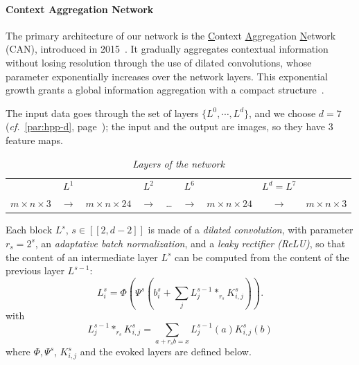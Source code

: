 \documentclass{article}
\begin{document}
            \paragraph{Context Aggregation Network}
            The primary architecture of our network is the \underline{C}ontext \underline{A}ggregation \underline{N}etwork (CAN), introduced in 2015~\cite{yu2015}. It gradually aggregates contextual information without losing resolution through the use of dilated convolutions, whose parameter exponentially increases over the network layers. This exponential growth grants a global information aggregation with a compact structure~\cite{yu2015,chen2017}.
            \par
            The input data goes through the set of layers $\{L^0, \cdots, L^d\}$, and we choose $d=7$ (\textit{cf.}~\ref{par:hpp-d}, page~\pageref{par:hpp-d}); the input and the output are images, so they have 3 feature maps.

            \begin{table}[!ht]
                \centering
                \begin{tabular}{ccccccccc}
                    \hline
                     & $L^1$ & & $L^2$ & & $L^6$ & & $L^d=L^7$ & \\
                    $m\times n\times 3$ & $\longrightarrow$ &$m\times n\times 24$ & $\longrightarrow$ & \dots & $\longrightarrow$ & $m\times n\times 24$ & $\longrightarrow$ & $m\times n\times 3$ \\
                    \hline
                \end{tabular}
                \caption{\textit{Layers of the network}}
            \end{table}
            \par
            Each block $L^s$, $s\in [\![2,d-2]\!]$ is made of a \textit{dilated convolution}, with parameter $r_s=2^s$, an \textit{adaptative batch normalization}, and a \textit{leaky rectifier (ReLU)}, so that the content of an intermediate layer $L^s$ can be computed from the content of the previous layer $L^{s-1}$:
            \begin{equation}
                L_i^s=\Phi\left(\Psi^s\left(b_i^s+\sum_jL_j^{s-1}*_{r_s}K^s_{i,j}\right)\right).
            \end{equation}
            with
            \begin{equation}
                L_j^{s-1}*_{r_s}K^s_{i,j}=\sum_{a+r_sb=x}L_j^{s-1}(a)K_{i,j}^s(b)
            \end{equation}
            where $\Phi, \Psi^s$, $K^s_{i,j}$ and the evoked layers are defined below.
\end{document}
